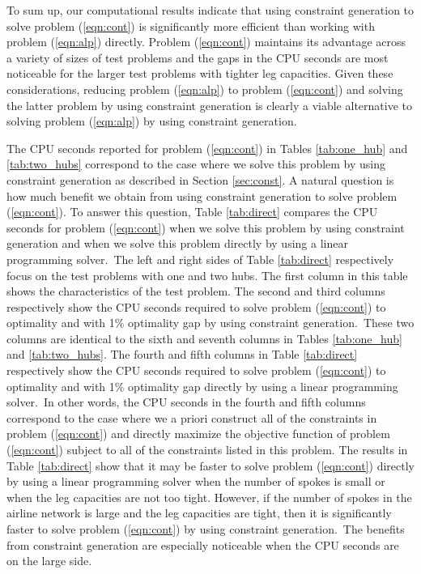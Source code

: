 To sum up, our computational results indicate that using constraint generation to solve problem \mbox{(\ref{eqn:cont})} is significantly more efficient than working with problem (\ref{eqn:alp}) directly. Problem (\ref{eqn:cont}) maintains its advantage across a variety of sizes of test problems and the gaps in the CPU seconds are most noticeable for the larger test problems with tighter leg capacities. Given these considerations, reducing problem (\ref{eqn:alp}) to problem (\ref{eqn:cont}) and solving the latter problem by using constraint generation is clearly a viable alternative to solving problem (\ref{eqn:alp})  by using constraint generation.


The CPU seconds reported for problem (\ref{eqn:cont}) in Tables \ref{tab:one_hub} and \ref{tab:two_hubs} correspond to the case where we solve this problem by using constraint generation as described in Section \ref{sec:const}. A natural question is how much benefit we obtain from using constraint generation to solve problem (\ref{eqn:cont}). To answer this question, Table \ref{tab:direct} compares the CPU seconds for problem (\ref{eqn:cont}) when we solve this problem by using constraint generation and when we solve this problem directly by using a linear programming solver.~The left and right sides of Table \ref{tab:direct} respectively focus on the test problems with one and two hubs. The first column in this table shows the characteristics of the test problem. The second and third columns respectively show the CPU seconds required to solve problem (\ref{eqn:cont}) to optimality and with 1\% optimality gap by using constraint generation.~These two columns are identical to the sixth and seventh columns in Tables \ref{tab:one_hub} and \ref{tab:two_hubs}. The fourth and fifth columns in Table \ref{tab:direct} respectively show the CPU seconds required to solve problem (\ref{eqn:cont}) to optimality and with 1\% optimality gap directly by using a linear programming solver.~In other words, the CPU seconds in the fourth and fifth columns correspond to the case where we a priori construct all of the constraints in problem (\ref{eqn:cont}) and directly maximize the objective function of problem (\ref{eqn:cont}) subject to all of the constraints listed in this problem. The results in Table \ref{tab:direct} show that it may be faster to solve problem (\ref{eqn:cont}) directly by using a linear programming solver when the number of spokes is small or when the leg capacities are not too tight. However, if the number of spokes in the airline network is large and the leg capacities are tight, then it is significantly faster to solve problem (\ref{eqn:cont}) by using constraint generation.~The benefits from constraint generation are especially noticeable when the CPU seconds are on the large side.


